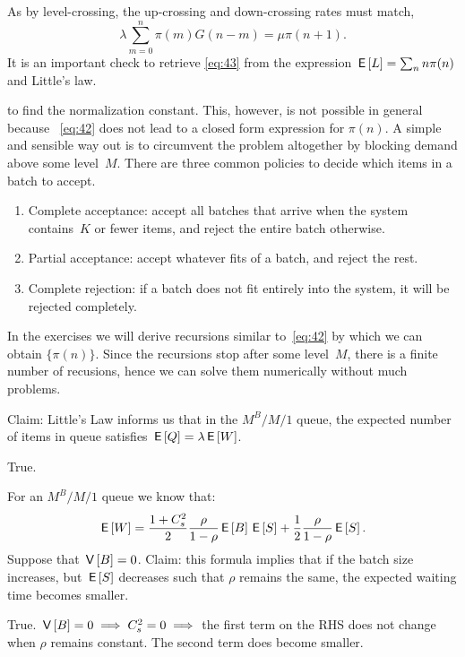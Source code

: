 \documentclass[stochastic-or.tex]{subfiles}
\begin{document}
As by level-crossing, the up-crossing and down-crossing rates must match,
\begin{equation}\label{eq:42}
\lambda \sum_{m=0}^n \pi(m) G(n-m) = \mu \pi(n+1).
\end{equation}
It is an important check to retrieve \cref{eq:43} from the expression $\,\mathsf{E}\left[L\right] = \sum_{n} n \pi(n)$ and Little's law.

 to find the normalization constant.
This, however, is not possible in general because ~\cref{eq:42} does not lead to a closed form expression for $\pi(n)$.
A simple and sensible way out is to circumvent the problem altogether by blocking demand above some level~$M$.
There are three common policies to decide which items in a batch to accept.
\begin{enumerate}
\item Complete acceptance: accept all batches that arrive when the system contains~$K$ or fewer items, and reject the entire batch otherwise.
\item Partial acceptance: accept whatever fits of a batch, and reject the rest.
\item Complete rejection: if a batch does not fit entirely into the system, it will be rejected completely.
\end{enumerate}
In the exercises we will derive recursions similar to~\cref{eq:42} by which we can obtain $\{\pi(n)\}$.
Since the recursions stop after some level~$M$, there is a finite number of recusions, hence we can solve them numerically without much problems.


\begin{truefalse}
Claim:   Little's Law informs us that in the $M^{B}/M/1$ queue, the expected number of items in queue satisfies $\,\mathsf{E}\left[Q\right]=\lambda\,\mathsf{E}\left[W\right]$.
    \begin{solution}
        True.
    \end{solution}
\end{truefalse}

\begin{truefalse}
    For an $M^B/M/1$ queue we know that:
    $$
    \,\mathsf{E}\left[W\right]=\frac{1+C_s^2}{2}\frac{\rho}{1-\rho}\,\mathsf{E}\left[B\right]\,\mathsf{E}\left[S\right]+\frac{1}{2}\frac{\rho}{1-\rho}\,\mathsf{E}\left[S\right].
    $$
    Suppose that $\,\mathsf{V}\left[B\right] = 0$.
    Claim: this formula implies that if the batch size increases, but $\,\mathsf{E}\left[S\right]$ decreases such that $\rho$ remains the same, the expected waiting time becomes smaller.

    \begin{solution}
        True. $\,\mathsf{V}\left[B\right] = 0 \implies C_{s}^{2} = 0 \implies$ the first term on the RHS does not change when $\rho$ remains constant. The second term does become smaller.
    \end{solution}
\end{truefalse}
\end{document}

